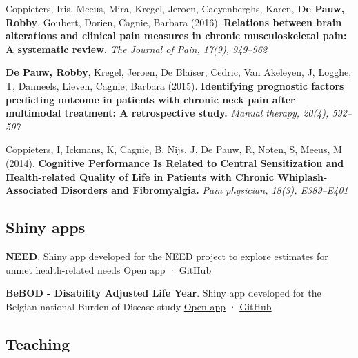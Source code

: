 \documentclass[
  letterpaper,
  DIV=11,
  numbers=noendperiod]{scrartcl}
\begin{document}
Coppieters, Iris, Meeus, Mira, Kregel, Jeroen, Caeyenberghs, Karen,
\textbf{De Pauw, Robby}, Goubert, Dorien, Cagnie, Barbara (2016).
\textbf{Relations between brain alterations and clinical pain measures
in chronic musculoskeletal pain: A systematic review.} \emph{The Journal
of Pain, 17(9), 949--962}

\textbf{De Pauw, Robby}, Kregel, Jeroen, De Blaiser, Cedric, Van
Akeleyen, J, Logghe, T, Danneels, Lieven, Cagnie, Barbara (2015).
\textbf{Identifying prognostic factors predicting outcome in patients
with chronic neck pain after multimodal treatment: A retrospective
study.} \emph{Manual therapy, 20(4), 592--597}

Coppieters, I, Ickmans, K, Cagnie, B, Nijs, J, De Pauw, R, Noten, S,
Meeus, M (2014). \textbf{Cognitive Performance Is Related to Central
Sensitization and Health-related Quality of Life in Patients with
Chronic Whiplash-Associated Disorders and Fibromyalgia.} \emph{Pain
physician, 18(3), E389--E401}

\subsection{Shiny apps}\label{apps}

\textbf{NEED}. Shiny app developed for the NEED project to explore
estimates for unmet health-related needs
\href{https://epidata.sciensano.be/NEED}{Open app} ·
\href{https://github.com/rdpauw}{GitHub}

\textbf{BeBOD - Disability Adjusted Life Year}. Shiny app developed for
the Belgian national Burden of Disease study
\href{https://burden.sciensano.be/shiny/daly}{Open app} ·
\href{https://github.com/rdpauw}{GitHub}

\subsection{Teaching}\label{teaching}
\end{document}
